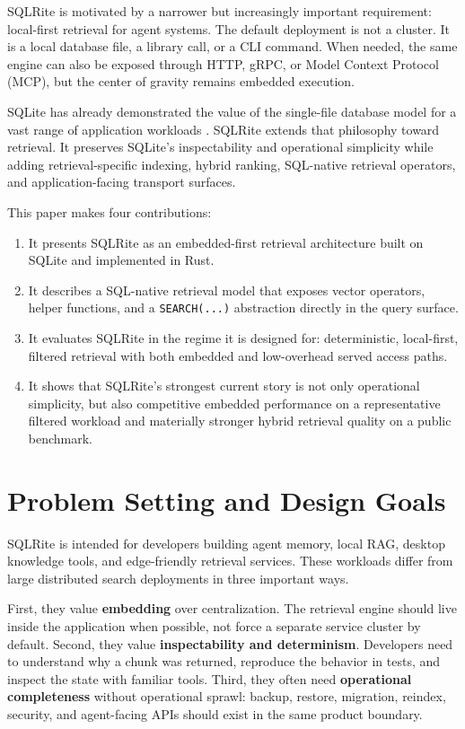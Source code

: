 \documentclass[11pt]{article}
\begin{document}
SQLRite is motivated by a narrower but increasingly important requirement: local-first retrieval for agent systems. The default deployment is not a cluster. It is a local database file, a library call, or a CLI command. When needed, the same engine can also be exposed through HTTP, gRPC, or Model Context Protocol (MCP), but the center of gravity remains embedded execution.

SQLite has already demonstrated the value of the single-file database model for a vast range of application workloads \citep{hipp2022sqlite}. SQLRite extends that philosophy toward retrieval. It preserves SQLite's inspectability and operational simplicity while adding retrieval-specific indexing, hybrid ranking, SQL-native retrieval operators, and application-facing transport surfaces.

This paper makes four contributions:
\begin{enumerate}[leftmargin=*, itemsep=0.2em]
  \item It presents SQLRite as an embedded-first retrieval architecture built on SQLite and implemented in Rust.
  \item It describes a SQL-native retrieval model that exposes vector operators, helper functions, and a \texttt{SEARCH(...)} abstraction directly in the query surface.
  \item It evaluates SQLRite in the regime it is designed for: deterministic, local-first, filtered retrieval with both embedded and low-overhead served access paths.
  \item It shows that SQLRite's strongest current story is not only operational simplicity, but also competitive embedded performance on a representative filtered workload and materially stronger hybrid retrieval quality on a public benchmark.
\end{enumerate}

\section{Problem Setting and Design Goals}
SQLRite is intended for developers building agent memory, local RAG, desktop knowledge tools, and edge-friendly retrieval services. These workloads differ from large distributed search deployments in three important ways.

First, they value \textbf{embedding} over centralization. The retrieval engine should live inside the application when possible, not force a separate service cluster by default. Second, they value \textbf{inspectability and determinism}. Developers need to understand why a chunk was returned, reproduce the behavior in tests, and inspect the state with familiar tools. Third, they often need \textbf{operational completeness} without operational sprawl: backup, restore, migration, reindex, security, and agent-facing APIs should exist in the same product boundary.
\end{document}
